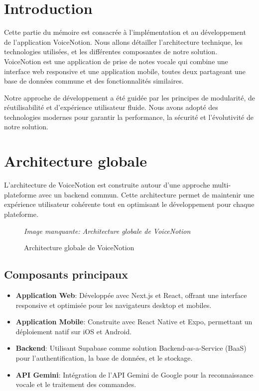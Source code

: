


\section{Introduction}
Cette partie du mémoire est consacrée à l'implémentation et au développement de l'application VoiceNotion. Nous allons détailler l'architecture technique, les technologies utilisées, et les différentes composantes de notre solution. VoiceNotion est une application de prise de notes vocale qui combine une interface web responsive et une application mobile, toutes deux partageant une base de données commune et des fonctionnalités similaires.

Notre approche de développement a été guidée par les principes de modularité, de réutilisabilité et d'expérience utilisateur fluide. Nous avons adopté des technologies modernes pour garantir la performance, la sécurité et l'évolutivité de notre solution.

\section{Architecture globale}
L'architecture de VoiceNotion est construite autour d'une approche multi-plateforme avec un backend commun. Cette architecture permet de maintenir une expérience utilisateur cohérente tout en optimisant le développement pour chaque plateforme.

\begin{figure}[H]
\centering
\textit{Image manquante: Architecture globale de VoiceNotion}
\caption{Architecture globale de VoiceNotion}
\label{fig:global-architecture}
\end{figure}

\subsection{Composants principaux}
\begin{itemize}
    \item \textbf{Application Web}: Développée avec Next.js et React, offrant une interface responsive et optimisée pour les navigateurs desktop et mobiles.
    \item \textbf{Application Mobile}: Construite avec React Native et Expo, permettant un déploiement natif sur iOS et Android.
    \item \textbf{Backend}: Utilisant Supabase comme solution Backend-as-a-Service (BaaS) pour l'authentification, la base de données, et le stockage.
    \item \textbf{API Gemini}: Intégration de l'API Gemini de Google pour la reconnaissance vocale et le traitement des commandes.
\end{itemize}

